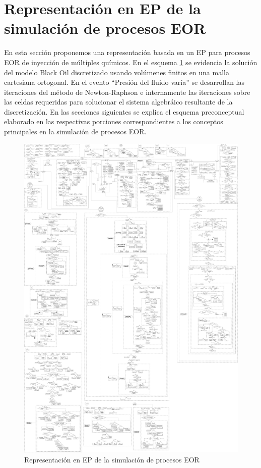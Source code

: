 \section{Representación en EP de la simulación de procesos EOR}\label{sec:PS_EOR}
En esta sección proponemos una representación basada en un EP para procesos EOR de inyección de múltiples químicos. En el esquema \ref{fig:PSComplete} se evidencia la solución del modelo Black Oil discretizado usando volúmenes finitos en una malla cartesiana ortogonal. En el evento ``Presión del fluido varía'' se desarrollan las iteraciones del método de Newton-Raphson e internamente las iteraciones sobre las celdas requeridas para solucionar el sistema algebráico resultante de la discretización. En las secciones siguientes se explica el esquema preconceptual elaborado en las respectivas porciones correspondientes a los conceptos principales en la simulación de procesos EOR.
\begin{figure}[h]
\centering%
\includegraphics[width=0.9\linewidth]{Kap4/MultifasicoSinPozos.pdf}%
\caption{Representación en EP de la simulación de procesos EOR} \label{fig:PSComplete}
\end{figure}

